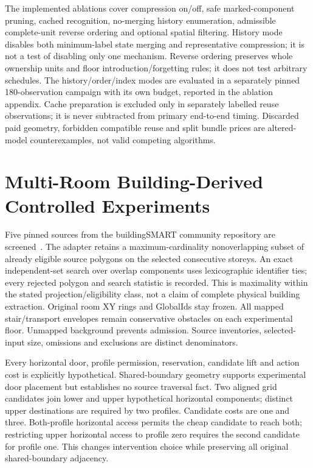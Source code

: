 The implemented ablations cover compression on/off, safe marked-component pruning, cached recognition, no-merging history enumeration, admissible complete-unit reverse ordering and optional spatial filtering. History mode disables both minimum-label state merging and representative compression; it is not a test of disabling only one mechanism. Reverse ordering preserves whole ownership units and floor introduction/forgetting rules; it does not test arbitrary schedules. The history/order/index modes are evaluated in a separately pinned 180-observation campaign with its own budget, reported in the ablation appendix. Cache preparation is excluded only in separately labelled reuse observations; it is never subtracted from primary end-to-end timing. Discarded paid geometry, forbidden compatible reuse and split bundle prices are altered-model counterexamples, not valid competing algorithms.

\section{Multi-Room Building-Derived Controlled Experiments}
Five pinned sources from the buildingSMART community repository are screened~\cite{publicifc,duplex}. The adapter retains a maximum-cardinality nonoverlapping subset of already eligible source polygons on the selected consecutive storeys. An exact independent-set search over overlap components uses lexicographic identifier ties; every rejected polygon and search statistic is recorded. This is maximality within the stated projection/eligibility class, not a claim of complete physical building extraction. Original room XY rings and GlobalIds stay frozen. All mapped stair/transport envelopes remain conservative obstacles on each experimental floor. Unmapped background prevents admission. Source inventories, selected-input size, omissions and exclusions are distinct denominators.

Every horizontal door, profile permission, reservation, candidate lift and action cost is explicitly hypothetical. Shared-boundary geometry supports experimental door placement but establishes no source traversal fact. Two aligned grid candidates join lower and upper hypothetical horizontal components; distinct upper destinations are required by two profiles. Candidate costs are one and three. Both-profile horizontal access permits the cheap candidate to reach both; restricting upper horizontal access to profile zero requires the second candidate for profile one. This changes intervention choice while preserving all original shared-boundary adjacency.

